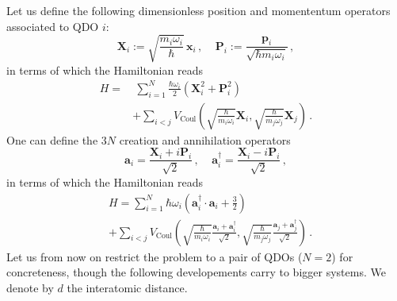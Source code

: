 \documentclass[reprint, amsmath, amssymb, aps, pra]{revtex4-2}
\begin{document}
        Let us define the following dimensionless position and momententum operators associated to QDO $i$:
        \begin{equation}
            \bm{X}_i := \sqrt{\frac{m_i\omega_i}{\hbar}}\,\bm{x}_i\,,\ \ \ \ \ \bm{P}_i := \frac{\bm{p}_i}{\sqrt{\hbar m_i\omega_i}}\,,
        \end{equation}
        in terms of which the Hamiltonian reads
        \begin{equation}
        \begin{split}
            H =&\ \sum_{i=1}^N\frac{\hbar\omega_i}{2}\left(\bm X_{i}^2 + \bm P_{i}^2\right) \\
            & + \sum_{i<j}V_\text{Coul}\left(\sqrt{\frac{\hbar}{m_i\omega_i}}\bm{X} _i, \sqrt{\frac{\hbar}{m_j\omega_j}}\bm{X} _j\right)\,.
        \end{split}
        \end{equation}
        One can define the $3N$ creation and annihilation operators
        \begin{equation}
            \bm a_{i} = \frac{\bm X_{i} + i\bm P_{i}}{\sqrt 2}\,,\ \ \ \ \ \bm a^\dagger_{i} = \frac{\bm X_{i} - i\bm P_{i}}{\sqrt 2}\,,
        \end{equation}
        in terms of which the Hamiltonian reads
        \begin{equation}
        \begin{split}
            &H = \sum_{i=1}^N\hbar\omega_i\left(\bm a_{i}^\dagger\cdot\bm a_{i} +\frac{3}{2}\right) \\
            & + \sum_{i<j}V_\text{Coul}\left(\sqrt{\frac{\hbar}{m_i\omega_i}}\frac{\bm a_i + \bm a_i^\dagger}{\sqrt 2}, \sqrt{\frac{\hbar}{m_j\omega_j}}\frac{\bm a_j + \bm a_j^\dagger}{\sqrt 2}\right)\,.
        \end{split}
        \end{equation}
        Let us from now on restrict the problem to a pair of QDOs ($N=2$) for concreteness, though the following developements carry to bigger systems. We denote by $d$ the interatomic distance.
\end{document}
